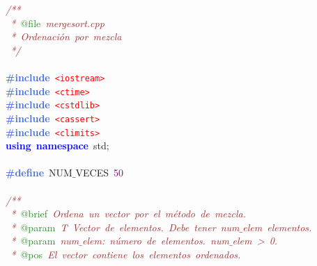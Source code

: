 \noindent
\mbox{}\textit{\textcolor{Brown}{/**}} \\
\mbox{}\textit{\textcolor{Brown}{\ *\ }}\textcolor{ForestGreen}{@file}\textit{\textcolor{Brown}{\ mergesort.cpp}} \\
\mbox{}\textit{\textcolor{Brown}{\ *\ Ordenación\ por\ mezcla}} \\
\mbox{}\textit{\textcolor{Brown}{\ */}} \\
\mbox{} \\
\mbox{}\textbf{\textcolor{RoyalBlue}{\#include}}\ \texttt{\textcolor{Red}{\textless{}iostream\textgreater{}}} \\
\mbox{}\textbf{\textcolor{RoyalBlue}{\#include}}\ \texttt{\textcolor{Red}{\textless{}ctime\textgreater{}}} \\
\mbox{}\textbf{\textcolor{RoyalBlue}{\#include}}\ \texttt{\textcolor{Red}{\textless{}cstdlib\textgreater{}}} \\
\mbox{}\textbf{\textcolor{RoyalBlue}{\#include}}\ \texttt{\textcolor{Red}{\textless{}cassert\textgreater{}}} \\
\mbox{}\textbf{\textcolor{RoyalBlue}{\#include}}\ \texttt{\textcolor{Red}{\textless{}climits\textgreater{}}} \\
\mbox{}\textbf{\textcolor{Blue}{using}}\ \textbf{\textcolor{Blue}{namespace}}\ std\textcolor{BrickRed}{;} \\
\mbox{} \\
\mbox{}\textbf{\textcolor{RoyalBlue}{\#define}}\ NUM$\_$VECES\ \textcolor{Purple}{50} \\
\mbox{} \\
\mbox{}\textit{\textcolor{Brown}{/**}} \\
\mbox{}\textit{\textcolor{Brown}{\ *\ }}\textcolor{ForestGreen}{@brief}\textit{\textcolor{Brown}{\ Ordena\ un\ vector\ por\ el\ método\ de\ mezcla.}} \\
\mbox{}\textit{\textcolor{Brown}{\ *\ }}\textcolor{ForestGreen}{@param}\textit{\textcolor{Brown}{\ T\ Vector\ de\ elementos.\ Debe\ tener\ num$\_$elem\ elementos.}} \\
\mbox{}\textit{\textcolor{Brown}{\ *\ }}\textcolor{ForestGreen}{@param}\textit{\textcolor{Brown}{\ num$\_$elem:\ número\ de\ elementos.\ num$\_$elem\ \textgreater{}\ 0.}} \\
\mbox{}\textit{\textcolor{Brown}{\ *\ }}\textcolor{ForestGreen}{@pos}\textit{\textcolor{Brown}{\ El\ vector\ contiene\ los\ elementos\ ordenados.}} \\
